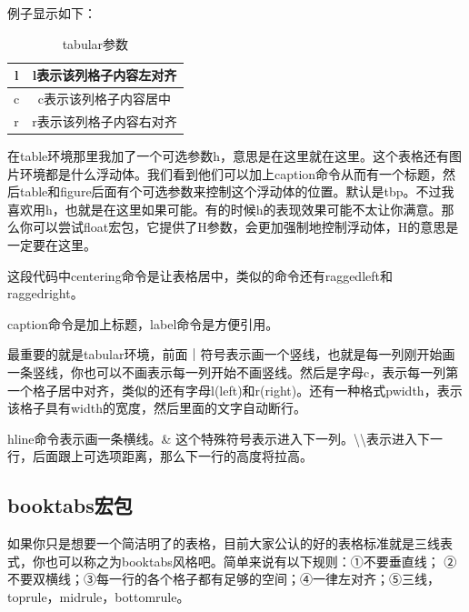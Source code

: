 \documentclass[11pt,oneside]{book}
\begin{document}
\begin{common-format}
例子显示如下：
\begin{table}[H]
\centering
\begin{tabular}{|c|c|}
\hline 
l & l表示该列格子内容左对齐 \\
\hline
c & c表示该列格子内容居中 \\  
\hline
r & r表示该列格子内容右对齐 \\ 
\hline
\end{tabular}
\caption{tabular参数}
\label{tab:tabular参数}
\end{table}
在table环境那里我加了一个可选参数h，意思是在这里就在这里。这个表格还有图片环境都是什么浮动体。我们看到他们可以加上caption命令从而有一个标题，然后table和figure后面有个可选参数来控制这个浮动体的位置。默认是tbp。不过我喜欢用h，也就是在这里如果可能。有的时候h的表现效果可能不太让你满意。那么你可以尝试float宏包，它提供了H参数，会更加强制地控制浮动体，H的意思是一定要在这里。

这段代码中centering命令是让表格居中，类似的命令还有raggedleft和raggedright。

caption命令是加上标题，label命令是方便引用。

最重要的就是tabular环境，前面｜符号表示画一个竖线，也就是每一列刚开始画一条竖线，你也可以不画表示每一列开始不画竖线。然后是字母c，表示每一列第一个格子居中对齐，类似的还有字母l(left)和r(right)。还有一种格式p{width}，表示该格子具有width的宽度，然后里面的文字自动断行。

hline命令表示画一条横线。\& 这个特殊符号表示进入下一列。\textbackslash \textbackslash 表示进入下一行，后面跟上可选项距离，那么下一行的高度将拉高。

\subsection{booktabs宏包}
如果你只是想要一个简洁明了的表格，目前大家公认的好的表格标准就是三线表式，你也可以称之为booktabs风格吧。简单来说有以下规则：①不要垂直线； ②不要双横线；③每一行的各个格子都有足够的空间；④一律左对齐；⑤三线，toprule，midrule，bottomrule。


\end{common-format}
\end{document}
